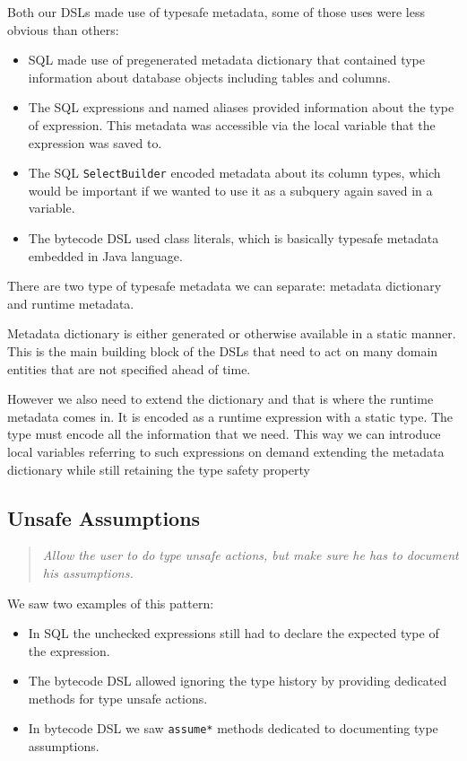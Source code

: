 \documentclass{sig-alternate}
\begin{document}
Both our DSLs made use of typesafe metadata, some of those uses were less obvious than others:
\begin{itemize}
\item SQL made use of pregenerated metadata dictionary that contained type information about database objects including tables and columns.
\item The SQL expressions and named aliases provided information about the type of expression. This metadata was accessible via the local variable that the expression was saved to.
\item The SQL \verb!SelectBuilder! encoded metadata about its column types, which would be important if we wanted to use it as a subquery again saved in a variable.
\item The bytecode DSL used class literals, which is basically typesafe metadata embedded in Java language.
\end{itemize}

There are two type of typesafe metadata we can separate: metadata dictionary and runtime metadata. 

Metadata dictionary is either generated or otherwise available in a static manner. This is the main building block of the DSLs that need to act on many domain entities that are not specified ahead of time. 

However we also need to extend the dictionary and that is where the runtime metadata comes in. It is encoded as a runtime expression with a static type. The type must encode all the information that we need. This way we can introduce local variables referring to such expressions on demand extending the metadata dictionary while still retaining the type safety property

\subsection{Unsafe Assumptions}

\begin{quote}
\emph{Allow the user to do type unsafe actions, but make sure he has to document his assumptions.}
\end{quote}

We saw two examples of this pattern:
\begin{itemize}
\item In SQL the unchecked expressions still had to declare the expected type of the expression.
\item The bytecode DSL allowed ignoring the type history by providing dedicated methods for type unsafe actions.
\item In bytecode DSL we saw \verb!assume*! methods dedicated to documenting type assumptions.
\end{itemize}
\end{document}
